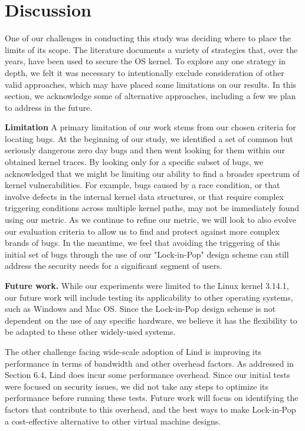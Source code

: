 \section{Discussion}
\label{sec.limitation}

One of our challenges in conducting this study was deciding where to place the
limits of its scope. The literature documents a variety of strategies that, over
the years, have been used to secure the OS kernel. To explore any one strategy
in depth, we felt it was necessary to intentionally exclude consideration of
other valid approaches, which may have placed some limitations on our results.
In this section, we acknowledge some of alternative
approaches, including a few we plan
to address in the future.

\textbf{Limitation }
A primary limitation of our work stems from our chosen criteria for locating
bugs. At the beginning
of our study, we identified a set of common but seriously dangerous zero day bugs
and then went looking for them within our obtained kernel traces. By looking only
for a specific subset of bugs, we acknowledged that we might be limiting our
ability to find a broader spectrum of kernel vulnerabilities. For example, bugs
caused by a race condition, or that involve defects in the internal kernel data
structures, or that require complex triggering conditions across multiple kernel
paths, may not be immediately found using our metric. As we continue to refine
our metric, we will look to also evolve our evaluation
criteria to allow us to find and protect against more complex brands of bugs.
In the meantime, we feel that avoiding the triggering of this initial set of bugs
through the use of our "Lock-in-Pop" design scheme can still address the security
needs for a significant segment of users.

\textbf{Future work.}
While our experiments were limited to the Linux kernel 3.14.1, our future work
will include testing its applicability to other operating systems, such as
Windows and Mac OS. Since the Lock-in-Pop design scheme is not dependent on the use of any
specific hardware, we believe it has the flexibility to be adapted to these other
widely-used systems.

The other challenge facing wide-scale adoption of Lind is improving its
performance in terms of bandwidth and other overhead factors. As addressed in
Section 6.4, Lind does incur some performance overhead. Since our initial tests
were focused on security issues, we did not take any steps to optimize
its performance before running these tests. Future work will focus on identifying
the factors that contribute to this overhead, and the best ways to make Lock-in-Pop
a cost-effective alternative to other virtual machine designs.

